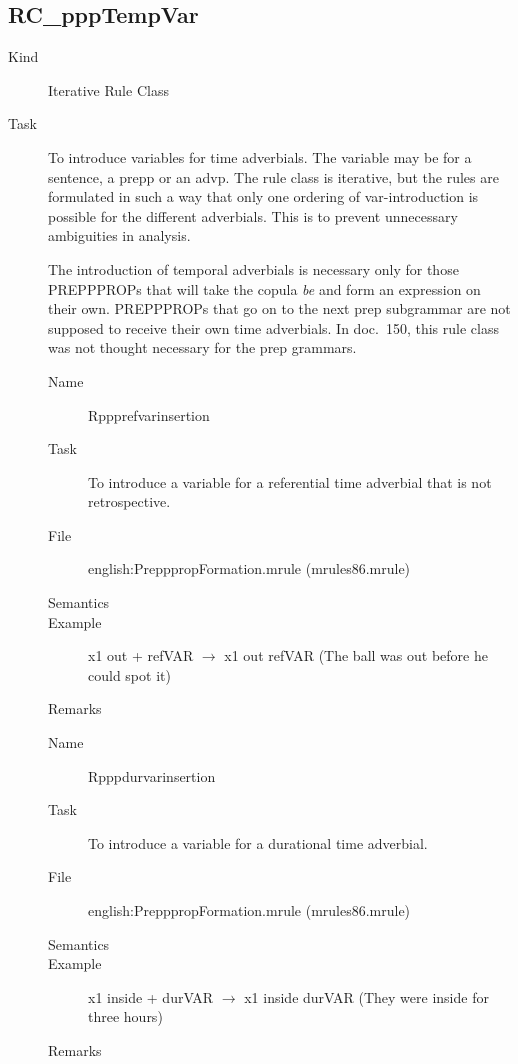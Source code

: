 \subsection{RC\_pppTempVar}
\begin{description}
\item[Kind] Iterative Rule Class
\item[Task] To introduce variables for time adverbials. The variable may be for 
a sentence, a prepp or an advp. The rule class is iterative, but the rules are 
formulated in such a way that only one ordering of var-introduction is possible 
for the different adverbials. This is to prevent unnecessary ambiguities in 
analysis.

The introduction of temporal adverbials is necessary only for those PREPPPROPs 
that will take the copula {\em be\/} and form an expression on their own. 
PREPPPROPs that go on to the next prep subgrammar are not supposed to receive 
their own time adverbials. In doc.\ 150, this rule class was not thought 
necessary for the prep grammars.

\vspace{1 cm}
\begin{description}
\item[Name] Rppprefvarinsertion
\item[Task] To introduce a variable for a referential time adverbial that is 
not retrospective.
\item[File] english:PrepppropFormation.mrule (mrules86.mrule)
\item[Semantics]
\item[Example] x1 out + refVAR $\rightarrow$ x1 out refVAR (The ball was out 
before he could spot it)
\item[Remarks]
\end{description}

\vspace{1 cm}
\begin{description}
\item[Name] Rpppdurvarinsertion
\item[Task] To introduce a variable for a durational time adverbial.
\item[File] english:PrepppropFormation.mrule (mrules86.mrule)
\item[Semantics]
\item[Example] x1 inside + durVAR $\rightarrow$ x1 inside durVAR (They were 
inside for three hours)
\item[Remarks]
\end{description}


\end{description}
